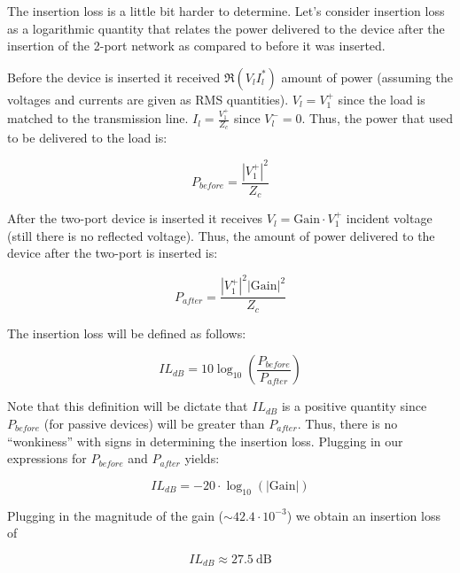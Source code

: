 The insertion loss is a little bit harder to determine. Let's consider insertion
loss as a logarithmic quantity that relates the power delivered to the device
after the insertion of the 2-port network as compared to before it was inserted.

Before the device is inserted it received $\Re({V_l I_l^*})$ amount of power
(assuming the voltages and currents are given as RMS quantities). $V_l = V_1^+$
since the load is matched to the transmission line. $I_l = \frac{V_1^+}{Z_c}$
since $V_l^- = 0$. Thus, the power that used to be delivered to the load is:

\[ 
        P_{before} = \frac{|V_1^+|^2}{Z_c} 
\]

After the two-port device is inserted it receives $V_l = \text{Gain} \cdot V_1^+$ incident voltage
(still there is no reflected voltage). Thus, the amount of power delivered to
the device after the two-port is inserted is:

\[ 
        P_{after} = \frac{\left| V_1^+ \right|^2 \left| \text{Gain} \right|^2}{Z_c} 
\]

The insertion loss will be defined as follows:

\[ 
        IL_{dB} = 10\log_{10}(\frac{P_{before}}{P_{after}})
\]

Note that this definition will be dictate that $IL_{dB}$ is a positive quantity
since $P_{before}$ (for passive devices) will be greater than $P_{after}$. Thus,
there is no ``wonkiness'' with signs in determining the insertion loss. Plugging
in our expressions for $P_{before}$ and $P_{after}$ yields:

\[
        IL_{dB} = -20 \cdot \log_{10}(\left| \text{Gain} \right|)
\]

Plugging in the magnitude of the gain ($\sim 42.4\cdot 10^{-3}$) we obtain an
insertion loss of 

\[ 
        IL_{dB} \approx 27.5~\text{dB}
\]

